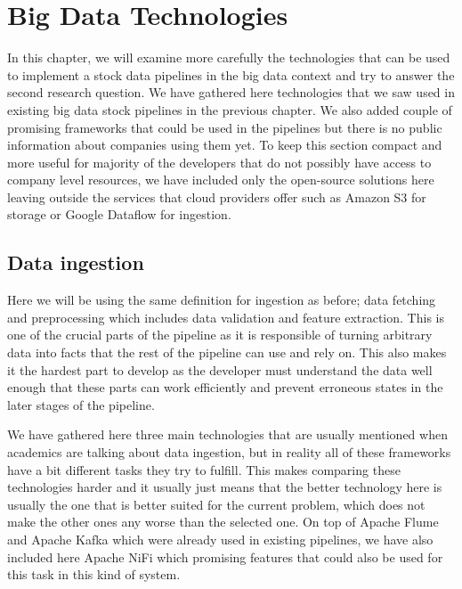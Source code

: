 \chapter{Big Data Technologies}
\label{chapter:environment}


In this chapter, we will examine more carefully the technologies that can be used to implement a stock data pipelines in the big data context and try to answer the second research question.
We have gathered here technologies that we saw used in existing big data stock pipelines in the previous chapter.
We also added couple of promising frameworks that could be used in the pipelines but there is no public information about companies using them yet.
To keep this section compact and more useful for majority of the developers that do not possibly have access to company level resources, we have included only the open-source solutions here leaving outside the services that cloud providers offer such as Amazon S3 for storage or Google Dataflow for ingestion.

\section{Data ingestion}

Here we will be using the same definition for ingestion as before; data fetching and preprocessing which includes data validation and feature extraction.
This is one of the crucial parts of the pipeline as it is responsible of turning arbitrary data into facts that the rest of the pipeline can use and rely on.
This also makes it the hardest part to develop as the developer must understand the data well enough that these parts can work efficiently and prevent erroneous states in the later stages of the pipeline.

We have gathered here three main technologies that are usually mentioned when academics are talking about data ingestion, but in reality all of these frameworks have a bit different tasks they try to fulfill.
This makes comparing these technologies harder and it usually just means that the better technology here is usually the one that is better suited for the current problem, which does not make the other ones any worse than the selected one.
On top of Apache Flume and Apache Kafka which were already used in existing pipelines, we have also included here Apache NiFi which promising features that could also be used for this task in this kind of system.

